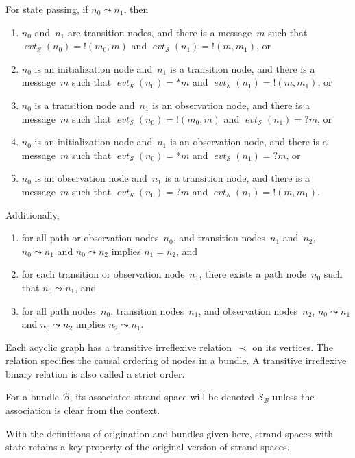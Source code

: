 \documentclass[12pt]{article}
\newcommand{\fn}[1]{\ensuremath{\operatorname{\mathit{#1}}}}
\newcommand{\start}{\mathord\ast}
\newcommand{\sync}{\mathord !}
\newcommand{\obsv}{\mathord ?}
\newcommand{\ssp}{\ensuremath{\mathcal{S}}}
\newcommand{\bun}{\ensuremath{\mathcal{B}}}
\newcommand{\evt}{\fn{evt}}
\begin{document}
For state passing, if $n_0\leadsto n_1$, then\marginpar{!}
\begin{enumerate}
\item $n_0$ and~$n_1$ are transition nodes, and there is a message~$m$
  such that $\evt_\ssp(n_0)=\sync(m_0,m)$ and
  $\evt_\ssp(n_1)=\sync(m,m_1)$, or
\item $n_0$ is an initialization node and~$n_1$ is a transition node,
  and there is a message~$m$ such that $\evt_\ssp(n_0)=\start m$ and
  $\evt_\ssp(n_1)=\sync(m,m_1)$, or
\item $n_0$ is a transition node and~$n_1$ is an observation node, and
  there is a message~$m$ such that $\evt_\ssp(n_0)=\sync(m_0,m)$ and
  $\evt_\ssp(n_1)=\obsv m$, or
\item $n_0$ is an initialization node and~$n_1$ is an observation
  node, and there is a message~$m$ such that $\evt_\ssp(n_0)=\start m$
  and $\evt_\ssp(n_1)=\obsv m$, or
\item $n_0$ is an observation node and~$n_1$ is a transition node, and
  there is a message~$m$ such that $\evt_\ssp(n_0)=\obsv m$ and
  $\evt_\ssp(n_1)=\sync(m,m_1)$.
\end{enumerate}
Additionally,
\begin{enumerate}
\item for all path or observation nodes~$n_0$, and transition
  nodes~$n_1$ and~$n_2$, $n_0\leadsto n_1$ and $n_0\leadsto n_2$ implies
  $n_1=n_2$, and 
\item for each transition or observation node~$n_1$, there exists a
  path node~$n_0$ such that $n_0\leadsto n_1$, and
\item for all path nodes~$n_0$, transition nodes~$n_1$, and
  observation nodes~$n_2$, $n_0\leadsto n_1$ and $n_0\leadsto n_2$
  implies $n_2\leadsto n_1$.
\end{enumerate}

Each acyclic graph has a transitive irreflexive relation~$\prec$ on
its vertices.  The relation specifies the causal ordering of nodes in
a bundle.  A transitive irreflexive binary relation is also called a
strict order.

For a bundle $\bun$, its associated strand space will be denoted
$\ssp_\bun$ unless the association is clear from the context.

With the definitions of origination and bundles given here, strand
spaces with state retains a key property of the original version
of strand spaces.
\end{document}
